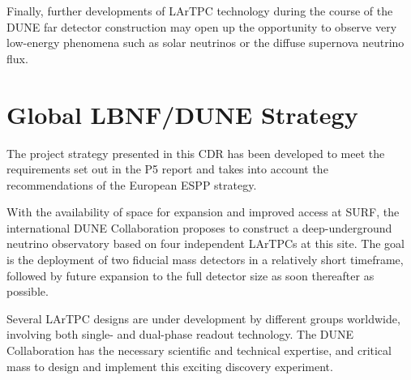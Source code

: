 
Finally, further developments of LArTPC %
technology during the course of the DUNE far detector construction may open up the opportunity
to observe very low-energy phenomena  such as solar neutrinos or the diffuse supernova neutrino flux.



\section{Global LBNF/DUNE Strategy}

The project strategy presented in this CDR has been developed to meet the requirements 
set out in the P5 report and %
takes into account the recommendations of the European 
ESPP strategy.

With the availability of space for expansion and improved access at SURF, %
the international DUNE Collaboration proposes to construct a deep-underground neutrino observatory based on four independent  LArTPCs at this site. %
The goal is the deployment of two  fiducial mass detectors in a relatively short timeframe, followed by future expansion to the full detector size as soon thereafter as possible. 

Several LArTPC designs are under development by different groups worldwide, involving both single- and dual-phase readout technology.
The DUNE %
Collaboration  has the necessary scientific and technical expertise, %
and critical mass   to design and implement this exciting discovery experiment. 

